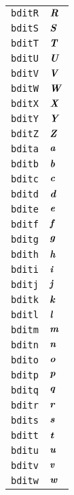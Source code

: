 \begin{longtable}{ll}
\texttt{bditR}&${}\textbf{\textit{R}}{}$\\
\texttt{bditS}&${}\textbf{\textit{S}}{}$\\
\texttt{bditT}&${}\textbf{\textit{T}}{}$\\
\texttt{bditU}&${}\textbf{\textit{U}}{}$\\
\texttt{bditV}&${}\textbf{\textit{V}}{}$\\
\texttt{bditW}&${}\textbf{\textit{W}}{}$\\
\texttt{bditX}&${}\textbf{\textit{X}}{}$\\
\texttt{bditY}&${}\textbf{\textit{Y}}{}$\\
\texttt{bditZ}&${}\textbf{\textit{Z}}{}$\\
\texttt{bdita}&${}\textbf{\textit{a}}{}$\\
\texttt{bditb}&${}\textbf{\textit{b}}{}$\\
\texttt{bditc}&${}\textbf{\textit{c}}{}$\\
\texttt{bditd}&${}\textbf{\textit{d}}{}$\\
\texttt{bdite}&${}\textbf{\textit{e}}{}$\\
\texttt{bditf}&${}\textbf{\textit{f}}{}$\\
\texttt{bditg}&${}\textbf{\textit{g}}{}$\\
\texttt{bdith}&${}\textbf{\textit{h}}{}$\\
\texttt{bditi}&${}\textbf{\textit{i}}{}$\\
\texttt{bditj}&${}\textbf{\textit{j}}{}$\\
\texttt{bditk}&${}\textbf{\textit{k}}{}$\\
\texttt{bditl}&${}\textbf{\textit{l}}{}$\\
\texttt{bditm}&${}\textbf{\textit{m}}{}$\\
\texttt{bditn}&${}\textbf{\textit{n}}{}$\\
\texttt{bdito}&${}\textbf{\textit{o}}{}$\\
\texttt{bditp}&${}\textbf{\textit{p}}{}$\\
\texttt{bditq}&${}\textbf{\textit{q}}{}$\\
\texttt{bditr}&${}\textbf{\textit{r}}{}$\\
\texttt{bdits}&${}\textbf{\textit{s}}{}$\\
\texttt{bditt}&${}\textbf{\textit{t}}{}$\\
\texttt{bditu}&${}\textbf{\textit{u}}{}$\\
\texttt{bditv}&${}\textbf{\textit{v}}{}$\\
\texttt{bditw}&${}\textbf{\textit{w}}{}$\\

\end{longtable}
